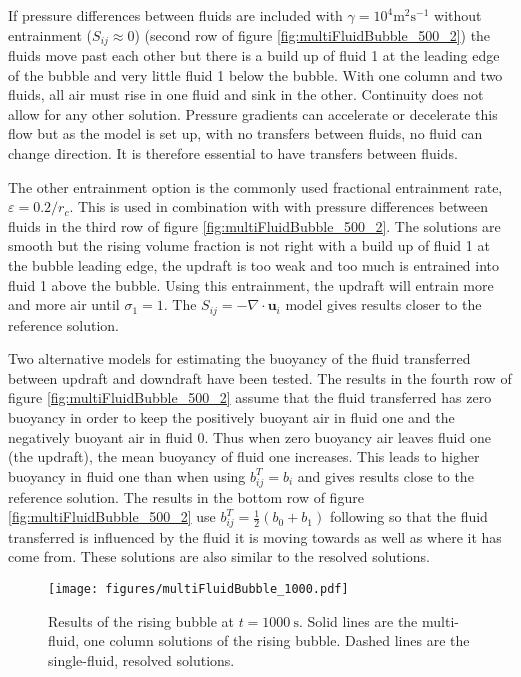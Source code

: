 \documentclass[draft]{agujournal2019}
\begin{document}
If pressure differences between fluids are included with $\gamma=10^{4}\text{m}^{2}\text{s}^{-1}$ without entrainment ($S_{ij}\approx 0$) (second row of figure \ref{fig:multiFluidBubble_500_2}) the fluids move past each other but there is 
a build up of fluid 1 at the leading edge of the bubble and very little fluid 1 below the bubble. With one column and two fluids, all air must rise in one fluid and sink in the other. Continuity does not allow for any other solution. Pressure gradients
can accelerate or decelerate this flow but as the model is set up, with no transfers between fluids, no fluid can change direction. It is therefore essential to have transfers between fluids.

The other entrainment option is the commonly used fractional entrainment
rate, $\varepsilon=0.2/r_{c}$. This is used in combination with with pressure differences between fluids in the third row of figure \ref{fig:multiFluidBubble_500_2}.
The solutions are smooth
but the rising volume fraction is not right with a build up of fluid 1 at the bubble leading edge, the updraft is too
weak and too much is entrained into fluid 1 above the bubble.
Using this entrainment, the updraft will entrain more and more air until $\sigma_{1}=1$. The $S_{ij}=-\nabla\cdot\mathbf{u}_{i}$ model gives
results closer to the reference solution.

Two alternative models for estimating the buoyancy of the fluid transferred
between updraft and downdraft have been tested. The results in
the fourth row of figure \ref{fig:multiFluidBubble_500_2} assume that the fluid transferred has zero buoyancy in order to keep the
positively buoyant air in fluid one and the negatively buoyant air
in fluid 0. Thus when zero buoyancy air leaves fluid one (the updraft),
the mean buoyancy of fluid one increases. This leads to
higher buoyancy in fluid one than when using $b_{ij}^T=b_i$ and gives results close to the reference solution.
The results in the bottom row of figure \ref{fig:multiFluidBubble_500_2}
use $b_{ij}^{T}=\frac{1}{2}\left(b_{0}+b_{1}\right)$ following 
so that the fluid transferred is influenced by the fluid it is moving
towards as well as where it has come from. 
These solutions are also similar to the resolved solutions.





\begin{figure}
\noindent
\texttt{[image: figures/multiFluidBubble\_1000.pdf]}
\caption{\label{fig:multiFluidBubble_1000} Results of the rising bubble at $t=1000\ \text{s}$. Solid lines are the multi-fluid, one column solutions of the rising bubble. Dashed lines are the single-fluid, resolved solutions.
}
\end{figure}
\end{document}
